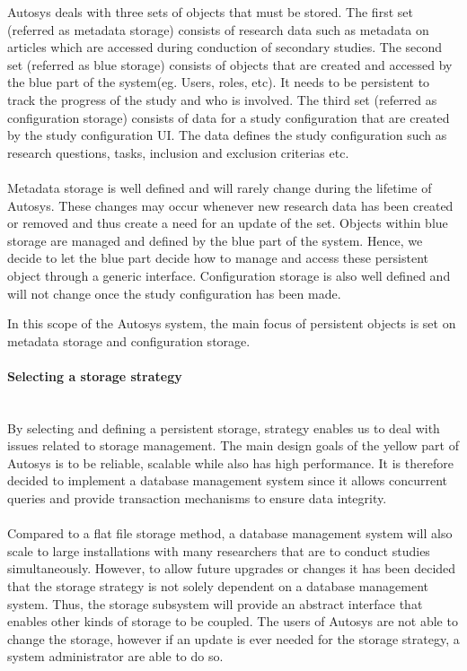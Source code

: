 Autosys deals with three sets of objects that must be stored.  The first set (referred as metadata storage) consists of research data such as metadata on articles which are accessed during conduction of secondary studies. The second set (referred as blue storage) consists of objects that are created and accessed by the blue part of the system(eg. Users, roles, etc). It needs to be persistent to track the progress of the study and who is involved. The third set (referred as configuration storage) consists of data for a study configuration that are created by the study configuration UI. The data defines the study configuration such as research questions, tasks, inclusion and exclusion criterias etc.\\\\ 

Metadata storage is well defined and will rarely change during the lifetime of Autosys. These changes may occur whenever new research data has been created or removed and thus create a need for an update of the set. Objects within blue storage are managed and defined by the blue part of the system. Hence, we decide to let the blue part decide how to manage and access these persistent object through a generic interface. Configuration storage is also well defined and will not change once the study configuration has been made.

In this scope of the Autosys system, the main focus of persistent objects is set on metadata storage and configuration storage.

\paragraph{Selecting a storage strategy}\mbox{}\\
By selecting and defining a persistent storage, strategy enables us to deal with issues related to storage management. The main design goals of the yellow part of Autosys is to be reliable, scalable while also has high performance. It is therefore decided to implement a database management system since it allows concurrent queries and provide transaction mechanisms to ensure data integrity. \\\\Compared to a flat file storage method, a database management system will also scale to large installations with many researchers that are to conduct studies simultaneously. However, to allow future upgrades or changes it has been decided that the storage strategy is not solely dependent on a database management system. Thus, the storage subsystem will provide an abstract interface that enables other kinds of storage to be coupled. The users of Autosys are not able to change the storage, however if an update is ever needed for the storage strategy, a system administrator are able to do so. 

